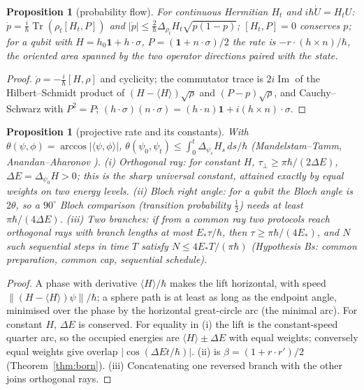 \documentclass[aps,pra,onecolumn,superscriptaddress,nofootinbib,10pt]{revtex4-2}
\newtheorem{proposition}[theorem]{Proposition}
\theoremstyle{definition}
\theoremstyle{remark}
\newcommand{\im}{\operatorname{Im}}
\newcommand{\tr}{\operatorname{Tr}}
\newcommand{\ip}[2]{\langle #1,#2\rangle}
\begin{document}
\begin{proposition}[probability flow]\label{prop:bdflow}
For continuous Hermitian $H_t$ and $i\hbar\dot U=H_tU$: $\dot p=\tfrac i\hbar\tr(\rho_t[H_t,P])$ and $\lvert\dot p\rvert\le\tfrac2\hbar\Delta_{\rho_t}H_t\sqrt{p(1-p)}$; $[H_t,P]=0$ conserves $p$; for a
qubit with $H=h_0\mathbf1+h\cdot\sigma$, $P=(\mathbf1+n\cdot\sigma)/2$ the rate is $-r\cdot(h\times n)/\hbar$, the oriented area spanned by the two operator directions
paired with the state.
\end{proposition}
\begin{proof}
$\dot\rho=-\tfrac i\hbar[H,\rho]$ and cyclicity; the commutator trace is $2i\im$ of the Hilbert--Schmidt product of $(H-\langle H\rangle)\sqrt\rho$ and $(P-p)\sqrt\rho$,
and Cauchy--Schwarz with $P^2=P$; $(h\cdot\sigma)(n\cdot\sigma)=(h\cdot n)\mathbf1+i(h\times n)\cdot\sigma$.
\end{proof}

\begin{proposition}[projective rate and its constants]\label{prop:bdmt}
With $\theta(\psi,\phi)=\arccos\lvert\ip\psi\phi\rvert$, $\theta(\psi_0,\psi_t)\le\int_0^t\Delta_{\psi_s}H_s\,ds/\hbar$ (Mandelstam--Tamm, Anandan--Aharonov \cite{n4:MT,n4:AA}).
(i) \emph{Orthogonal ray}: for constant $H$, $\tau_\perp\ge\pi\hbar/(2\Delta E)$, $\Delta E=\Delta_{\psi_0}H>0$; this is the sharp universal constant, attained exactly by
equal weights on two energy levels.  (ii) \emph{Bloch right angle}: for a qubit the Bloch angle is $2\theta$, so a $90^\circ$
Bloch comparison (transition probability $\tfrac12$) needs at least $\pi\hbar/(4\Delta E)$.  (iii) \emph{Two branches}: if from a common ray two
protocols reach orthogonal rays with branch lengths at most $E_*\tau/\hbar$, then $\tau\ge\pi\hbar/(4E_*)$, and $N$ such sequential steps in time $T$
satisfy $N\le4E_*T/(\pi\hbar)$ (Hypothesis Bs\label{hyp:Bs}: common preparation, common cap, sequential schedule).
\end{proposition}
\begin{proof}
A phase with derivative $\langle H\rangle/\hbar$ makes the lift horizontal, with speed $\lVert(H-\langle H\rangle)\psi\rVert/\hbar$; a sphere path is at least as long as
the endpoint angle, minimised over the phase by the horizontal great-circle arc (the minimal arc).  For
constant $H$, $\Delta E$ is conserved.  For equality in (i) the lift is the constant-speed quarter arc, so the occupied
energies are $\langle H\rangle\pm\Delta E$ with equal weights; conversely equal weights give overlap $\lvert\cos(\Delta Et/\hbar)\rvert$.  (ii) is $\beta=(1+r\cdot r')/2$
(Theorem~\ref{thm:born}).  (iii) Concatenating one reversed branch with the other joins orthogonal rays.
\end{proof}
\end{document}
